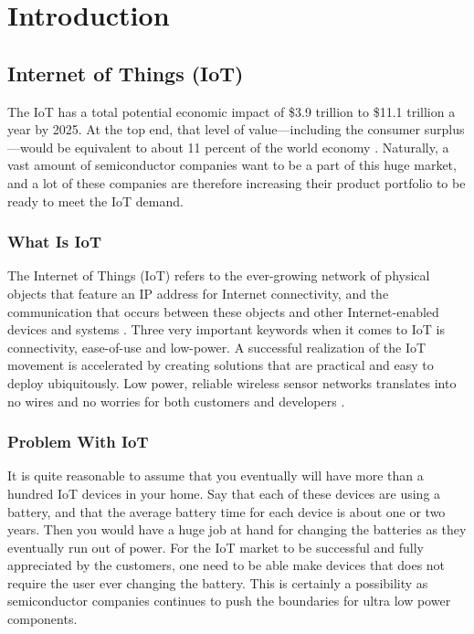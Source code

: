 \chapter{Introduction}

\section{Internet of Things (IoT)}

The IoT has a total potential economic impact of \$3.9 trillion to \$11.1 trillion a year by 2025. At the top end, that level of value—including the consumer surplus—would be equivalent to about 11 percent of the world economy \cite{mckinsey15}. Naturally, a vast amount of semiconductor companies want to be a part of this huge market, and a lot of these companies are therefore increasing their product portfolio to be ready to meet the IoT demand. 

\subsection{What Is IoT}

The Internet of Things (IoT) refers to the ever-growing network of physical objects that feature an IP address for Internet connectivity, and the communication that occurs between these objects and other Internet-enabled devices and systems \cite{webopedia}. Three very important keywords when it comes to IoT is connectivity, ease-of-use and low-power. A successful realization of the IoT movement is accelerated by creating solutions that are practical and easy to deploy ubiquitously. Low power, reliable wireless sensor networks translates into no wires and no worries for both customers and developers \cite{embedded_IoT}. 

\subsection{Problem With IoT}

It is quite reasonable to assume that you eventually will have more than a hundred IoT devices in your home. Say that each of these devices are using a battery, and that the average battery time for each device is about one or two years. Then you would have a huge job at hand for changing the batteries as they eventually run out of power. For the IoT market to be successful and fully appreciated by the customers, one need to be able make devices that does not require the user ever changing the battery. This is certainly a possibility as semiconductor companies continues to push the boundaries for ultra low power components.  

